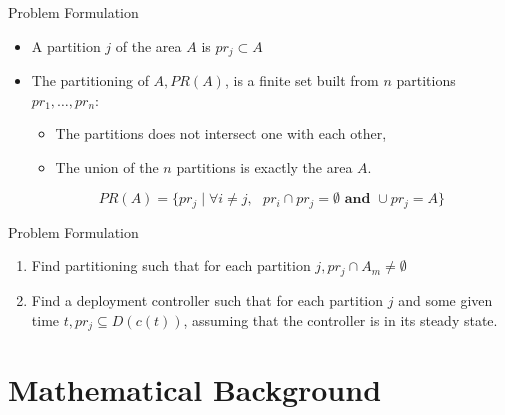 \documentclass[t]{beamer}
\begin{document}
\begin{frame}[label=probformulation2]{Problem Formulation}
\begin{itemize}
\item A partition $j$ of the area $A$ is $pr_{j} \subset A$
\item The partitioning of $A, PR\left( A \right)$, is a finite set built from $n$ partitions $pr_{1},\ldots,pr_n$:
\begin{itemize}
\item The partitions does not intersect one with each other,
\item The union of the $n$ partitions is exactly the area $A$.
\end{itemize}
\begin{equation*}
PR\left( A \right) = \{ pr_{j} \mid \forall i \neq j,\textbf{ } pr_{i}\cap pr_{j} = \emptyset \textbf{ and }\cup pr_{j} = A \}
\end{equation*}
\end{itemize}
\end{frame}
\begin{frame}[label=probformulation2]{Problem Formulation}
\begin{problem} \label{GeneralProblem}
\begin{enumerate}
\item Find partitioning such that for each partition $j, pr_{j} \cap A_m \neq \emptyset$ 
\item Find a deployment controller such that for each partition $j$ and some given time $t, {pr_{j}} \subseteq D\left( c\left( t \right) \right)$, assuming that the controller is in its steady state.
\end{enumerate}
\end{problem}
\end{frame}


\section[Mathematical Background]{Mathematical Background}
\end{document}
